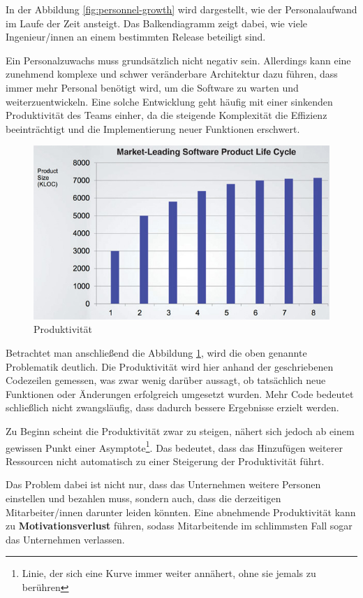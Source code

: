 In der Abbildung \ref{fig:personnel-growth} wird dargestellt, wie der Personalaufwand im Laufe der Zeit ansteigt.
Das Balkendiagramm zeigt dabei, wie viele Ingenieur/innen an einem bestimmten Release beteiligt sind.

Ein Personalzuwachs muss grundsätzlich nicht negativ sein. Allerdings kann eine zunehmend komplexe und schwer veränderbare Architektur dazu führen, dass immer mehr Personal benötigt wird, um die Software zu warten und weiterzuentwickeln. 
Eine solche Entwicklung geht häufig mit einer sinkenden Produktivität des Teams einher, da die steigende Komplexität die Effizienz beeinträchtigt und die Implementierung neuer Funktionen erschwert.

\clearpage

\begin{figure}[H]
    \centering
    \includegraphics[width=0.8\linewidth]{images/EA/diagram_productivity.jpg}
    \caption{Produktivität \\ \cite[S. 6]{EA:Book01}}
    \label{fig:productivity}
\end{figure}

Betrachtet man anschließend die Abbildung \ref{fig:productivity}, wird die oben genannte Problematik deutlich.
Die Produktivität wird hier anhand der geschriebenen Codezeilen gemessen, was zwar wenig darüber aussagt, ob tatsächlich neue Funktionen oder Änderungen erfolgreich umgesetzt wurden. Mehr Code bedeutet schließlich nicht zwangsläufig, dass dadurch bessere Ergebnisse erzielt werden.

Zu Beginn scheint die Produktivität zwar zu steigen, nähert sich jedoch ab einem gewissen Punkt einer Asymptote\footnote{Linie, der sich eine Kurve immer weiter annähert, ohne sie jemals zu berühren}. Das bedeutet, dass das Hinzufügen weiterer Ressourcen nicht automatisch zu einer Steigerung der Produktivität führt. 

Das Problem dabei ist nicht nur, dass das Unternehmen weitere Personen einstellen und bezahlen muss, sondern auch, dass die derzeitigen Mitarbeiter/innen darunter leiden könnten. Eine abnehmende Produktivität kann zu \textbf{Motivationsverlust} führen, sodass Mitarbeitende im schlimmsten Fall sogar das Unternehmen verlassen. 
\cite[S. 5-10]{EA:Book01} 

